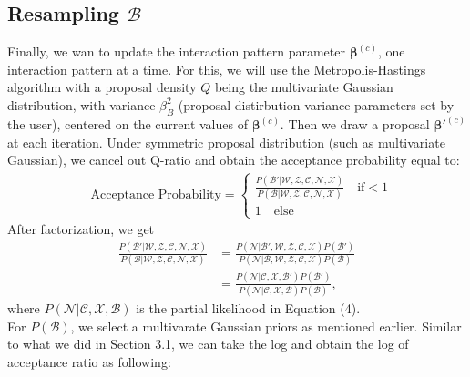 \documentclass[a4paper]{article}
\begin{document}
 \subsection{Resampling $\mathcal{B}$}
 Finally, we wan to update the interaction pattern parameter $\boldsymbol{\beta}^{(c)}$, one interaction pattern at a time. For this, we will use the Metropolis-Hastings algorithm with a proposal density $Q$ being the multivariate Gaussian distribution, with variance $\beta^2_B$ (proposal distirbution variance parameters set by the
 user), centered on the current values of $\boldsymbol{\beta}^{(c)}$. Then we draw a proposal $\boldsymbol{\beta}'^{(c)}$ at each iteration. Under symmetric proposal distribution (such as multivariate Gaussian), we cancel out Q-ratio and obtain the acceptance probability equal to:
 \begin{equation}
 \begin{split}
 & \mbox{Acceptance Probability}=
 \begin{cases}  \frac{P(\mathcal{B'}|\mathcal{W}, \mathcal{Z}, \mathcal{C}, \mathcal{N}, \mathcal{X})}{P(\mathcal{B}|\mathcal{W}, \mathcal{Z}, \mathcal{C}, \mathcal{N}, \mathcal{X})}\quad\text{if}  <1\\
 1 \quad \text{else}
 \end{cases}
 \end{split}
 \end{equation}
 After factorization, we get
 \begin{equation}
 \begin{aligned}
 \frac{P(\mathcal{B'}|\mathcal{W},\mathcal{Z}, \mathcal{C}, \mathcal{N}, \mathcal{X})}{P(\mathcal{B}|\mathcal{W}, \mathcal{Z}, \mathcal{C}, \mathcal{N}, \mathcal{X})} &=\frac{P(\mathcal{N}|\mathcal{B'}, \mathcal{W}, \mathcal{Z}, \mathcal{C}, \mathcal{X})P(\mathcal{B'})}{P(\mathcal{N}|\mathcal{B}, \mathcal{W}, \mathcal{Z},  \mathcal{C}, \mathcal{X})P(\mathcal{B})}\\&=\frac{P(\mathcal{N}|\mathcal{C}, \mathcal{X}, \mathcal{B'})P(\mathcal{B'})}{P(\mathcal{N}|\mathcal{C}, \mathcal{X}, \mathcal{B})P(\mathcal{B})},
 \end{aligned}
 \end{equation}
 where $P(\mathcal{N}|\mathcal{C}, \mathcal{X}, \mathcal{B})$ is the partial likelihood in Equation (4).\\ \newline For $P(\mathcal{B})$, we select a multivarate Gaussian priors as mentioned earlier. Similar to what we did in Section 3.1, we can take the log and obtain the log of acceptance ratio as following:
\end{document}
